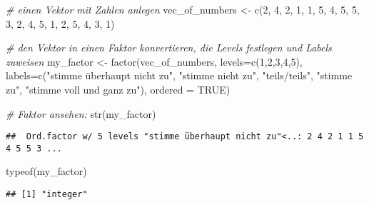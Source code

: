 \documentclass[
]{book}
\newenvironment{Shaded}{\begin{snugshade}}{\end{snugshade}}
\newcommand{\AttributeTok}[1]{\textcolor[rgb]{0.77,0.63,0.00}{#1}}
\newcommand{\CommentTok}[1]{\textcolor[rgb]{0.56,0.35,0.01}{\textit{#1}}}
\newcommand{\ConstantTok}[1]{\textcolor[rgb]{0.00,0.00,0.00}{#1}}
\newcommand{\DecValTok}[1]{\textcolor[rgb]{0.00,0.00,0.81}{#1}}
\newcommand{\FunctionTok}[1]{\textcolor[rgb]{0.00,0.00,0.00}{#1}}
\newcommand{\NormalTok}[1]{#1}
\newcommand{\OtherTok}[1]{\textcolor[rgb]{0.56,0.35,0.01}{#1}}
\newcommand{\StringTok}[1]{\textcolor[rgb]{0.31,0.60,0.02}{#1}}
\begin{document}
\begin{Shaded}
\begin{Highlighting}[]
\CommentTok{\# einen Vektor mit Zahlen anlegen}
\NormalTok{vec\_of\_numbers }\OtherTok{\textless{}{-}} \FunctionTok{c}\NormalTok{(}\DecValTok{2}\NormalTok{, }\DecValTok{4}\NormalTok{, }\DecValTok{2}\NormalTok{, }\DecValTok{1}\NormalTok{, }\DecValTok{1}\NormalTok{, }\DecValTok{5}\NormalTok{, }\DecValTok{4}\NormalTok{, }\DecValTok{5}\NormalTok{, }\DecValTok{5}\NormalTok{, }\DecValTok{3}\NormalTok{, }\DecValTok{2}\NormalTok{, }\DecValTok{4}\NormalTok{, }\DecValTok{5}\NormalTok{, }\DecValTok{1}\NormalTok{, }\DecValTok{2}\NormalTok{, }\DecValTok{5}\NormalTok{, }\DecValTok{4}\NormalTok{, }\DecValTok{3}\NormalTok{, }\DecValTok{1}\NormalTok{)}

\CommentTok{\# den Vektor in einen Faktor konvertieren, die Levels festlegen und Labels zuweisen}
\NormalTok{my\_factor }\OtherTok{\textless{}{-}} \FunctionTok{factor}\NormalTok{(vec\_of\_numbers, }
             \AttributeTok{levels=}\FunctionTok{c}\NormalTok{(}\DecValTok{1}\NormalTok{,}\DecValTok{2}\NormalTok{,}\DecValTok{3}\NormalTok{,}\DecValTok{4}\NormalTok{,}\DecValTok{5}\NormalTok{),}
             \AttributeTok{labels=}\FunctionTok{c}\NormalTok{(}\StringTok{"stimme überhaupt nicht zu"}\NormalTok{, }
                      \StringTok{"stimme nicht zu"}\NormalTok{, }
                      \StringTok{"teils/teils"}\NormalTok{, }
                      \StringTok{"stimme zu"}\NormalTok{, }
                      \StringTok{"stimme voll und ganz zu"}\NormalTok{),}
              \AttributeTok{ordered =} \ConstantTok{TRUE}\NormalTok{)}
                      
\CommentTok{\# Faktor ansehen:}
\FunctionTok{str}\NormalTok{(my\_factor)}
\end{Highlighting}
\end{Shaded}

\begin{verbatim}
##  Ord.factor w/ 5 levels "stimme überhaupt nicht zu"<..: 2 4 2 1 1 5 4 5 5 3 ...
\end{verbatim}

\begin{Shaded}
\begin{Highlighting}[]
\FunctionTok{typeof}\NormalTok{(my\_factor)}
\end{Highlighting}
\end{Shaded}

\begin{verbatim}
## [1] "integer"
\end{verbatim}
\end{document}
